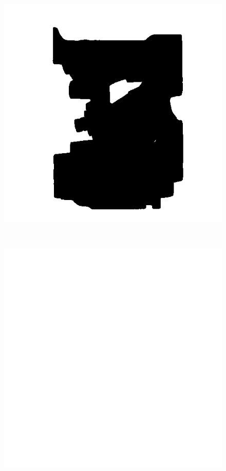 \begin{figure}
	\centering
	\begin{minipage}{.33\textwidth}
		\includegraphics[width=1\linewidth]{images/engine_naive_saliencemap_left}
		\subcaption{}
	\end{minipage}~
	\begin{minipage}{.33\textwidth}
		\includegraphics[width=1\linewidth]{images/engine_naive_saliencemap_1}

\end{minipage}
\end{figure}
